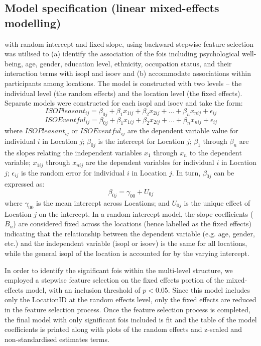 \subsection{Model specification (linear mixed-effects modelling)}

 with random intercept and fixed slope, using backward stepwise feature selection was utilised to (a) identify the association of the \glspl{foi} including psychological well-being, age, gender, education level, ethnicity, occupation status, and their interaction terms with \gls{isopl} and \gls{isoev} and (b) accommodate associations within participants among locations. The model is constructed with two levels -- the individual level (the random effects) and the location level (the fixed effects). Separate models were constructed for each \gls{isopl} and \gls{isoev} and take the form:
%
\begin{equation}
  \label{eqn:whoPl}
  ISOPleasant_{ij} = \beta_{0j} + \beta_1 x_{1ij} + \beta_2 x_{2ij} + \ldots + \beta_n x_{nij} + \epsilon_{ij}
\end{equation}
%
\begin{equation}
  \label{eqn:whoEv}
  ISOEventful_{ij} = \beta_{0j} + \beta_1 x_{1ij} + \beta_2 x_{2ij} + \ldots + \beta_n x_{nij} + \epsilon_{ij}
\end{equation}
%
where $ISOPleasant_{ij}$ or $ISOEventful_{ij}$ are the dependent variable value for individual $i$ in Location $j$; $\beta_{0j}$ is the intercept for Location $j$; $\beta_1$ through $\beta_n$ are the slopes relating the independent variables $x_1$ through $x_n$ to the dependent variable; $x_{1ij}$ through $x_{nij}$ are the dependent variables for individual $i$ in Location $j$; $\epsilon_{ij}$ is the random error for individual $i$ in Location $j$. In turn, $\beta_{0j}$ can be expressed as:
%
\begin{equation}
  \beta_{0j} = \gamma_{00} + U_{0j}
\end{equation}
%
where $\gamma_{00}$ is the mean intercept across Locations; and $U_{0j}$ is the unique effect of Location $j$ on the intercept. In a random intercept model, the slope coefficients ($B_n$) are considered fixed across the locations (hence labelled as the fixed effects) indicating that the relationship between the dependent variable (e.g. age, gender, etc.) and the independent variable (\gls{isopl} or \gls{isoev}) is the same for all locations, while the general \gls{isopl} of the location is accounted for by the varying intercept.

In order to identify the significant \glspl{foi} within the multi-level structure, we employed a stepwise feature selection on the fixed effects portion of the mixed-effects model, with an inclusion threshold of $p < 0.05$. Since this model includes only the LocationID at the random effects level, only the fixed effects are reduced in the feature selection process. Once the feature selection process is completed, the final model with only significant \glspl{foi} included is fit and the table of the model coefficients is printed along with plots of the random effects and z-scaled and non-standardised estimates terms.

